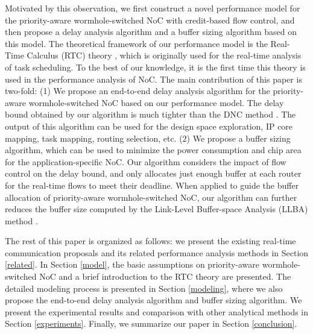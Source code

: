 \documentclass[preprint]{elsarticle}
\begin{document}
Motivated by this observation, we first construct a novel performance model for the priority-aware wormhole-switched NoC with credit-based flow control, and then propose a delay analysis algorithm and a buffer sizing algorithm based on this model. The theoretical framework of our performance model is the Real-Time Calculus (RTC) theory \cite{1253607}, which is originally used for the real-time analysis of task scheduling. To the best of our knowledge, it is the first time this theory is used in the performance analysis of NoC. The main contribution of this paper is two-fold: (1) We propose an end-to-end delay analysis algorithm for the priority-aware wormhole-switched NoC based on our performance model. The delay bound obtained by our algorithm is much tighter than the DNC method \cite{Qian489900}. The output of this algorithm can be used for the design space exploration, IP core mapping, task mapping, routing selection, etc. (2) We propose a buffer sizing algorithm, which can be used to minimize the power consumption and chip area for the application-specific NoC. Our algorithm considers the impact of flow control on the delay bound, and only allocates just enough buffer at each router for the real-time flows to meet their deadline. When applied to guide the buffer allocation of priority-aware wormhole-switched NoC, our algorithm can further reduces the buffer size computed by the Link-Level Buffer-space Analysis (LLBA) method \cite{189}.

The rest of this paper is organized as follows: we present the existing real-time communication proposals and its related performance analysis methods in Section \ref{related}. In Section \ref{model}, the basic assumptions on priority-aware wormhole-switched NoC and a brief introduction to the RTC theory are presented. The detailed modeling process is presented in Section \ref{modeling}, where we also propose the end-to-end delay analysis algorithm and buffer sizing algorithm. We present the experimental results and comparison with other analytical methods in Section \ref{experiments}. Finally, we summarize our paper in Section \ref{conclusion}.
\end{document}
